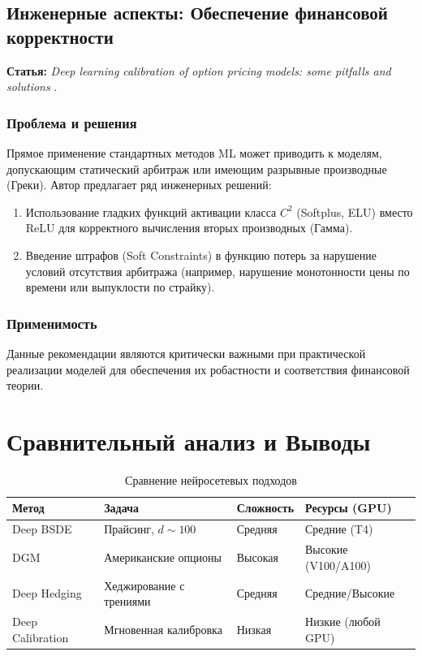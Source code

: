 \documentclass[12pt, a4paper]{article}
\begin{document}
\subsection{Инженерные аспекты: Обеспечение финансовой корректности}
\textbf{Статья:} \textit{Deep learning calibration of option pricing models: some pitfalls and solutions} \cite{Itkin2019}.

\subsubsection{Проблема и решения}
Прямое применение стандартных методов ML может приводить к моделям, допускающим статический арбитраж или имеющим разрывные производные (Греки).
Автор предлагает ряд инженерных решений:
\begin{enumerate}
    \item Использование гладких функций активации класса $C^2$ (Softplus, ELU) вместо ReLU для корректного вычисления вторых производных (Гамма).
    \item Введение штрафов (Soft Constraints) в функцию потерь за нарушение условий отсутствия арбитража (например, нарушение монотонности цены по времени или выпуклости по страйку).
\end{enumerate}

\subsubsection{Применимость}
Данные рекомендации являются критически важными при практической реализации моделей для обеспечения их робастности и соответствия финансовой теории.
\section{Сравнительный анализ и Выводы}

\begin{table}[h!]
    \centering
    \caption{Сравнение нейросетевых подходов}
    \label{tab:comparison}
    \begin{tabular}{|p{3cm}|p{4cm}|p{3cm}|p{4cm}|}
        \hline
        \textbf{Метод} & \textbf{Задача} & \textbf{Сложность} & \textbf{Ресурсы (GPU)} \\
        \hline
        Deep BSDE & Прайсинг, $d \sim 100$ & Средняя & Средние (T4) \\
        \hline
        DGM & Американские опционы & Высокая & Высокие (V100/A100) \\
        \hline
        Deep Hedging & Хеджирование с трениями & Средняя & Средние/Высокие \\
        \hline
        Deep Calibration & Мгновенная калибровка & Низкая & Низкие (любой GPU) \\
        \hline
    \end{tabular}
\end{table}
\end{document}
